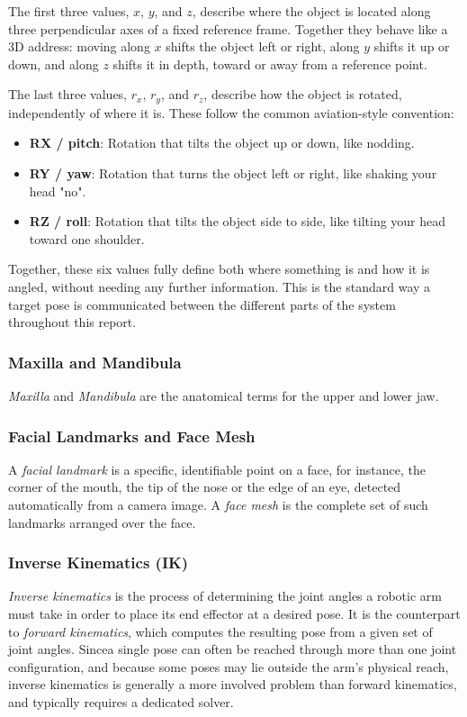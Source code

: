 The first three values, $x$, $y$, and $z$, describe where the object is located along three perpendicular axes of a fixed reference frame. Together they behave like a 3D address: moving along $x$ shifts the object left or right, along $y$ shifts it up or down, and along $z$ shifts it in depth, toward or away from a reference point.

The last three values, $r_x$, $r_y$, and $r_z$, describe how the object is rotated, independently of where it is. These follow the common aviation-style convention:
\begin{itemize}
    \item \textbf{RX / pitch}: Rotation that tilts the object up or down, like nodding.
    \item \textbf{RY / yaw}: Rotation that turns the object left or right, like shaking your head "no".
    \item \textbf{RZ / roll}: Rotation that tilts the object side to side, like tilting your head toward one shoulder.
\end{itemize}

Together, these six values fully define both where something is and how it is angled, without needing any further information. This is the standard way a target pose is communicated between the different parts of the system throughout this report.

\subsubsection{Maxilla and Mandibula}
\emph{Maxilla} and \emph{Mandibula} are the anatomical terms for the upper and lower jaw.

\subsubsection{Facial Landmarks and Face Mesh}
A \emph{facial landmark} is a specific, identifiable point on a face, for instance, the corner of the mouth, the tip of the nose or the edge of an eye, detected automatically from a camera image.
A \emph{face mesh} is the complete set of such landmarks arranged over the face. 

\subsubsection{Inverse Kinematics (IK)}
\emph{Inverse kinematics} is the process of determining the joint angles a robotic arm must take in order to place its end effector at a desired pose. 
It is the counterpart to \emph{forward kinematics}, which computes the resulting pose from a given set of joint angles. Sincea single pose can often be reached through more than one joint configuration, and because some poses may lie outside the arm's physical reach, inverse kinematics is generally a more involved problem than forward kinematics, and typically requires a dedicated solver.

